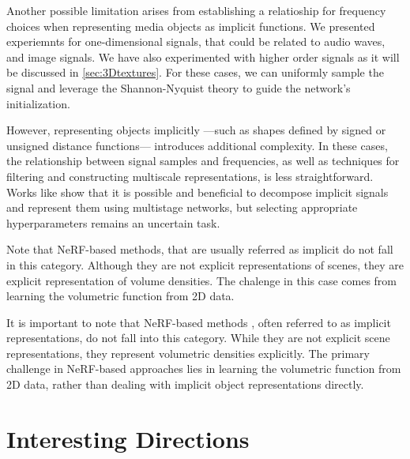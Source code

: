 Another possible limitation arises from establishing a relatioship for frequency choices when representing media objects as implicit functions. We presented experiemnts for one-dimensional signals, that could be related to audio waves, and image signals. We have also experimented with higher order signals as it will be discussed in \ref{sec:3Dtextures}. For these cases, we can uniformly sample the signal and leverage the Shannon-Nyquist theory to guide the network's initialization.

However, representing objects implicitly —such as shapes defined by signed or unsigned distance functions— introduces additional complexity. In these cases, the relationship between signal samples and frequencies, as well as techniques for filtering and constructing multiscale representations, is less straightforward. Works like \cite{silva2022mipplicits} show that it is possible and beneficial to decompose implicit signals and represent them using multistage networks, but selecting appropriate hyperparameters remains an uncertain task.


Note that NeRF-based methods, that are usually referred as implicit do not fall in this category. Although they are not explicit representations of scenes, they are explicit representation of volume densities. The chalenge in this case comes from learning the volumetric function from 2D data.

It is important to note that NeRF-based methods \citep{2020nerf}, often referred to as implicit representations, do not fall into this category. While they are not explicit scene representations, they represent volumetric densities explicitly. The primary challenge in NeRF-based approaches lies in learning the volumetric function from 2D data, rather than dealing with implicit object representations directly.


\section{Interesting Directions}

